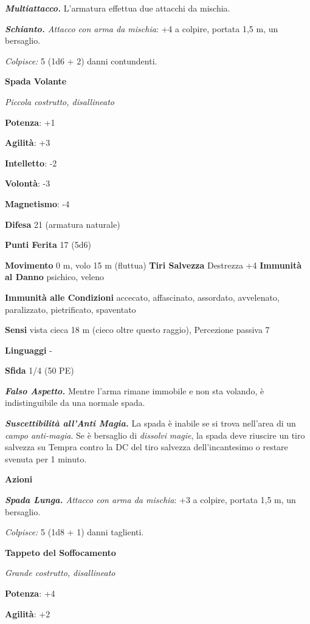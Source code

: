 \begin{multicols}{2}
\emph{\textbf{Multiattacco.}} L'armatura effettua due attacchi da
mischia.

\emph{\textbf{Schianto.} Attacco con arma da mischia}: +4 a colpire,
portata 1,5 m, un bersaglio.

\emph{Colpisce:} 5 (1d6 + 2) danni contundenti.

\textbf{Spada Volante}

\emph{Piccola costrutto, disallineato}

\textbf{Potenza}: +1

\textbf{Agilità}: +3

\textbf{Intelletto}: -2

\textbf{Volontà}: -3

\textbf{Magnetismo}: -4

\textbf{Difesa} 21 (armatura naturale)

\textbf{Punti Ferita} 17 (5d6)

\textbf{Movimento} 0 m, volo 15 m (fluttua) \textbf{Tiri Salvezza}
Destrezza +4 \textbf{Immunità al Danno} psichico, veleno

\textbf{Immunità alle Condizioni} accecato, affascinato, assordato,
avvelenato, paralizzato, pietrificato, spaventato

\textbf{Sensi} vista cieca 18 m (cieco oltre questo raggio), Percezione
passiva 7

\textbf{Linguaggi} -

\textbf{Sfida} 1/4 (50 PE)

\emph{\textbf{Falso Aspetto.}} Mentre l'arma rimane immobile e non sta
volando, è indistinguibile da una normale spada.

\emph{\textbf{Suscettibilità all'Anti Magia.}} La spada è inabile se si
trova nell'area di un \emph{campo anti-magia}. Se è bersaglio di
\emph{dissolvi} \emph{magie}, la spada deve riuscire un tiro salvezza su Tempra contro la DC del tiro salvezza dell'incantesimo o restare
svenuta per 1 minuto.

\textbf{Azioni}

\emph{\textbf{Spada Lunga.} Attacco con arma da mischia}: +3 a colpire,
portata 1,5 m, un bersaglio.

\emph{Colpisce:} 5 (1d8 + 1) danni taglienti.



\textbf{Tappeto del Soffocamento}

\emph{Grande costrutto, disallineato}

\textbf{Potenza}: +4

\textbf{Agilità}: +2


\end{multicols}
